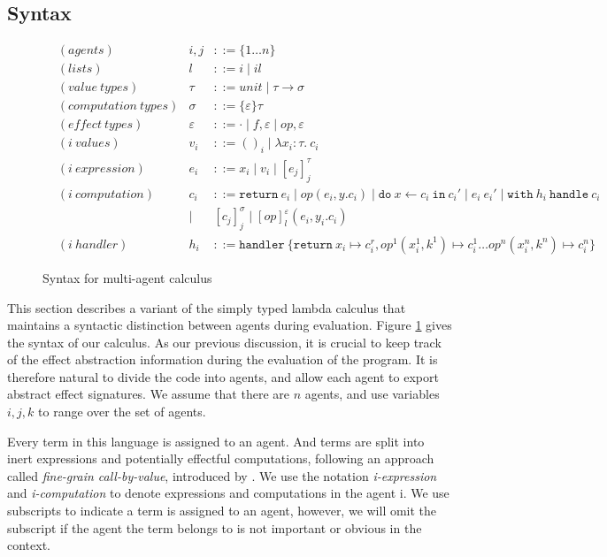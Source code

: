 \subsection{Syntax}
\begin{figure}
\label{fig-syntax}
\begin{align*}
&(agents) &i, j &::= \{1 \dots n\}\\
&(lists) & l &::= i \mid il\\
&(value\ types) &\tau &::= unit \mid \tau \rightarrow \sigma\\
&(computation\ types) &\sigma &::= \{\varepsilon\}\tau\\
&(effect\ types) &\varepsilon &::= \cdot \mid f, \varepsilon \mid op, \varepsilon\\
&(i\  values) &{v_i} &::= ()_i \mid \lambda x_i:\tau.\ c_i\\
&(i\ expression) &e_i &::= x_i \mid v_i \mid [e_j]^\tau_j \\
&(i\ computation) &c_i &::= \texttt{return}\ e_i \mid op(e_i, y.c_i) \mid \texttt{do}\ x \leftarrow c_i\ \texttt{in}\ c_i' \mid e_i\ e_i' \mid \texttt{with}\ h_i\ \texttt{handle}\ c_i\\
 &\ &\mid\ &[c_j]^\sigma_j \mid [op]^\varepsilon_l (e_i, y_i.c_i)\\
&(i\ handler) &h_i &::= \texttt{handler}\ \{\texttt{return}\ x_i \mapsto c^r_i, op^1(x_i^1, k^1) \mapsto c_i^1 \dots  op^n(x_i^n, k^n) \mapsto c_i^n\}  
\end{align*}
\caption{Syntax for multi-agent calculus}
\end{figure}

This section describes a variant of the simply typed lambda calculus that maintains a syntactic distinction between agents during evaluation. Figure \ref{fig-syntax} gives the syntax of our calculus. As our previous discussion, it is crucial to keep track of the effect abstraction information during the evaluation of the program. It is therefore natural to divide the code into agents, and allow each agent to export abstract effect signatures. We assume that there are $n$ agents, and use variables $i, j, k$ to range over the set of agents. 

Every term in this language is assigned to an agent. And terms are split into inert expressions and potentially effectful computations, following an approach called \emph{fine-grain call-by-value}, introduced by \citet{levy03}. We use the notation \emph{i-expression} and \emph{i-computation} to denote expressions and computations in the agent i. We use subscripts to indicate a term is assigned to an agent, however, we will omit the subscript if the agent the term belongs to is not important or obvious in the context.

